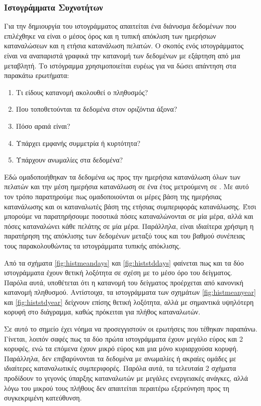 \subsubsection{Ιστογράμματα Συχνοτήτων}
Για την δημιουργία του ιστογράμματος απαιτείται ένα διάνυσμα δεδομένων που επιλέχθηκε να είναι ο μέσος  όρος και η τυπική απόκλιση των ημερήσιων καταναλώσεων και η ετήσια κατανάλωση πελατών. Ο σκοπός ενός ιστογράμματος είναι να αναπαριστά γραφικά την κατανομή των δεδομένων με εξάρτηση από μια μεταβλητή. Το ιστόγραμμα χρησιμοποιείται ευρέως για να δώσει απάντηση στα παρακάτω ερωτήματα\cite{histogram}:
\begin{enumerate}
\item Τι είδους κατανομή ακολουθεί ο πληθυσμός?
\item Που τοποθετούνται τα δεδομένα στον οριζόντια άξονα?
\item Πόσο αραιά είναι?
\item Υπάρχει εμφανής συμμετρία ή κυρτότητα?
\item Υπάρχουν ανωμαλίες στα δεδομένα?
\end{enumerate}
Εδώ ομαδοποιήθηκαν τα δεδομένα ως προς την ημερήσια κατανάλωση όλων των πελατών και την μέση ημερήσια κατανάλωση σε ένα έτος μετρούμενη σε . Με αυτό τον τρόπο παρατηρούμε πως ομαδοποιούνται οι μέρες βάση της ημερήσιας κατανάλωσης και οι καταναλωτές βάση της ετήσιας συμπεριφοράς κατανάλωσης. Έτσι μπορούμε να παρατηρήσουμε ποσοτικά πόσες  καταναλώνονται σε μία μέρα, αλλά και πόσες  καταναλώνει κάθε πελάτης σε μία μέρα. Παράλληλα, είναι ιδιαίτερα χρήσιμη η παρατήρηση της απόκλισης των δεδομένων μεταξύ τους και του βαθμού συνέπειας τους παρακολουθώντας τα ιστογράμματα τυπικής απόκλισης.\par
Από τα σχήματα \ref{fig:histmeandays} και \ref{fig:histstddays} φαίνεται πως και τα δύο ιστογράμματα έχουν θετική λοξότητα σε σχέση με το μέσο όρο του δείγματος. Παρόλα αυτά, υποθέτεται ότι η κατανομή του δείγματος προέρχεται από κανονική κατανομή πληθυσμού. Αντίστοιχα, τα ιστογράμματα των σχημάτων \ref{fig:histmeanyear} και \ref{fig:histstdyear} δείχνουν επίσης θετική λοξότητα, αλλά με σημαντικά υψηλότερη κορυφή στο διάγραμμα, καθώς πρόκειται για πλήθος καταναλωτών.\par
Σε αυτό το σημείο έχει νόημα να προσεγγιστούν οι ερωτήσεις που τέθηκαν παραπάνω. Γίνεται, λοιπόν σαφές πως τα δύο πρώτα ιστογράμματα έχουν μεγάλο εύρος και 2 κορυφές, ενώ τα επόμενα έχουν μικρό εύρος και μια μόνο κυριαρχούσα κορυφή. Παράλληλα, δεν επιβαρύνονται τα δεδομένα με ανωμαλίες ή ακραίες ομάδες με ιδιαίτερες καταναλωτικές συμπεριφορές. Παρόλα αυτά, τα τελευταία 2 σχήματα προδίδουν το γεγονός ύπαρξης καταναλωτών με μεγάλες ενεργειακές ανάγκες, αλλά λόγω του μικρού τους πλήθους δεν απαιτείται περαιτέρω εξερεύνηση προς τη συγκεκριμένη κατεύθυνση.

